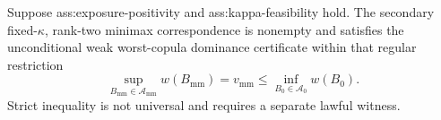 Suppose ass:exposure-positivity and ass:kappa-feasibility hold.  The secondary fixed-\(\kappa\), rank-two minimax correspondence is nonempty and satisfies the unconditional weak worst-copula dominance certificate within that regular restriction
\[
\sup_{B_{\mathrm{mm}}\in\mathcal A_{\mathrm{mm}}}w(B_{\mathrm{mm}})
=v_{\mathrm{mm}}
\le
\inf_{B_0\in\mathcal A_0}w(B_0).
\]
Strict inequality is not universal and requires a separate lawful witness.